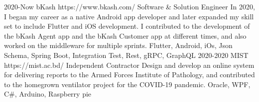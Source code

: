 
\horizontalLineRight

\listItemOne
    {2020-Now}
    {bKash}
    {https://www.bkash.com/}
    {Software \& Solution Engineer}
    {In 2020, I began my career as a native Android app developer and later expanded my skill set to include Flutter and iOS development. I contributed to the development of the bKash Agent app and the bKash Customer app at different times, and also worked on the middleware for multiple sprints.}
    {Flutter, Android, iOs, Json Schema, Spring Boot, Integration Test, Rest, gRPC, GraphQL}
\listItemOne
    {2020-2020}
    {MIST}
    {https://mist.ac.bd/}
    {Independent Contractor}
    {Design and develop an online system for delivering reports to the Armed Forces Institute of Pathology,
        and contributed to the homegrown ventilator project for the COVID-19 pandemic.}
    {Oracle, WPF, C\#, Arduino, Raspberry pie}%